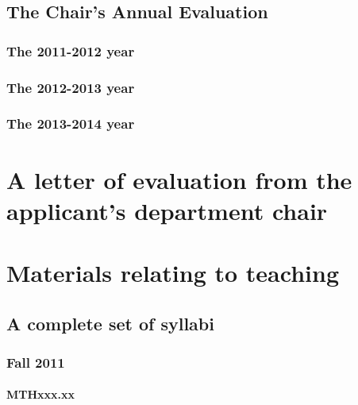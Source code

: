 \documentclass[ openright,titlepage,numbers=noenddot,headinclude,%
                footinclude=true,cleardoublepage=empty,abstractoff, 
                BCOR=5mm,paper=letter,fontsize=11pt,%
                ngerman, american, %
                ]{scrreprt}
\begin{document}
\section{The Chair's Annual Evaluation}
\subsection{The 2011-2012 year}

\subsection{The 2012-2013 year}

\subsection{The 2013-2014 year}



\chapter{A letter of evaluation from the applicant's department chair}


\chapter{Materials relating to teaching}

\section{A complete set of syllabi}
\subsection{Fall 2011}
\subsubsection{MTHxxx.xx}

\end{document}
